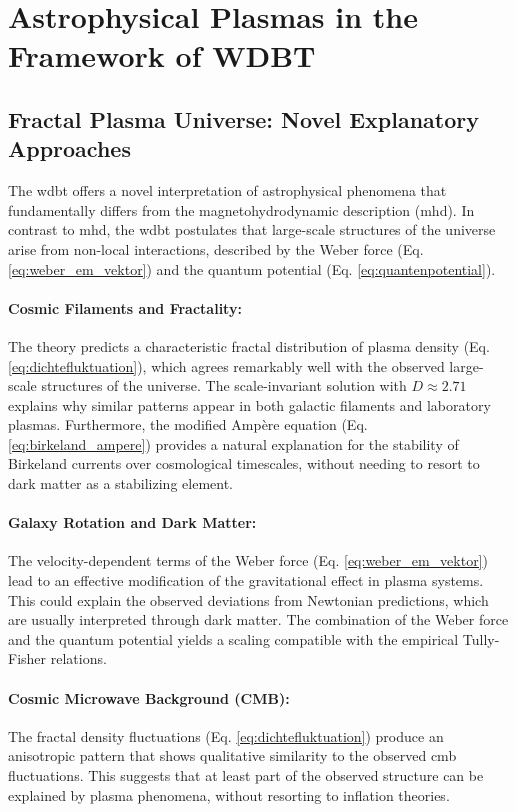 \chapter{Astrophysical Plasmas in the Framework of WDBT}
\section{Fractal Plasma Universe: Novel Explanatory Approaches}
The \gls{wdbt} offers a novel interpretation of astrophysical phenomena that fundamentally differs from the magnetohydrodynamic description (\gls{mhd}). In contrast to \gls{mhd}, the \gls{wdbt} postulates that large-scale structures of the universe arise from non-local interactions, described by the Weber force (Eq. \ref{eq:weber_em_vektor}) and the quantum potential (Eq. \ref{eq:quantenpotential}).

\subsubsection{Cosmic Filaments and Fractality:}
The theory predicts a characteristic fractal distribution of plasma density (Eq. \ref{eq:dichtefluktuation}), which agrees remarkably well with the observed large-scale structures of the universe. The scale-invariant solution with $D \approx 2.71$ explains why similar patterns appear in both galactic filaments and laboratory plasmas. Furthermore, the modified Ampère equation (Eq. \ref{eq:birkeland_ampere}) provides a natural explanation for the stability of Birkeland currents over cosmological timescales, without needing to resort to dark matter as a stabilizing element.

\subsubsection{Galaxy Rotation and Dark Matter:}
The velocity-dependent terms of the Weber force (Eq. \ref{eq:weber_em_vektor}) lead to an effective modification of the gravitational effect in plasma systems. This could explain the observed deviations from Newtonian predictions, which are usually interpreted through dark matter. The combination of the Weber force and the quantum potential yields a scaling compatible with the empirical Tully-Fisher relations.

\subsubsection{Cosmic Microwave Background (CMB):}
The fractal density fluctuations (Eq. \ref{eq:dichtefluktuation}) produce an anisotropic pattern that shows qualitative similarity to the observed \gls{cmb} fluctuations. This suggests that at least part of the observed structure can be explained by plasma phenomena, without resorting to inflation theories.

